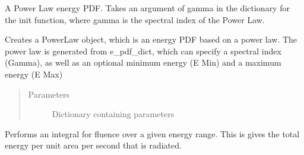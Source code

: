 \documentclass[letterpaper,10pt,english]{sphinxmanual}
\begin{document}
\begin{fulllineitems}
\label{\detokenize{index:flarestack.core.energy_pdf.PowerLaw}}
A Power Law energy PDF. Takes an argument of gamma in the dictionary
for the init function, where gamma is the spectral index of the Power Law.

\begin{fulllineitems}
\label{\detokenize{index:flarestack.core.energy_pdf.PowerLaw.__init__}}
Creates a PowerLaw object, which is an energy PDF based on a power
law. The power law is generated from e\_pdf\_dict, which can specify a
spectral index (Gamma), as well as an optional minimum energy (E Min)
and a maximum energy (E Max)
\begin{quote}\begin{description}
\item[{Parameters}] \leavevmode
{} \textendash{} Dictionary containing parameters

\end{description}\end{quote}

\end{fulllineitems}


\begin{fulllineitems}
\label{\detokenize{index:flarestack.core.energy_pdf.PowerLaw.f}}
\end{fulllineitems}


\begin{fulllineitems}
\label{\detokenize{index:flarestack.core.energy_pdf.PowerLaw.fluence_integral}}
Performs an integral for fluence over a given energy range. This is
gives the total energy per unit area per second that is radiated.


\end{fulllineitems}
\end{fulllineitems}
\end{document}

